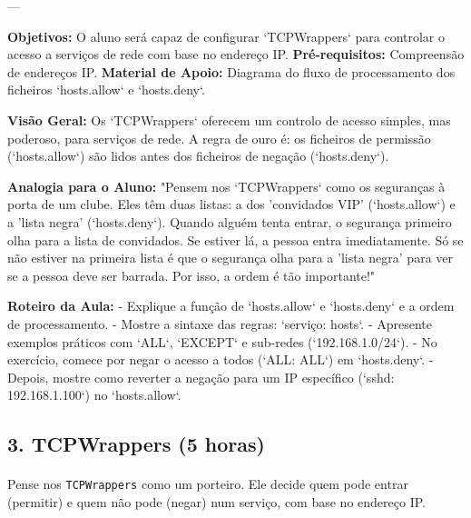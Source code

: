 \documentclass[10pt,a4paper]{article}
\newcommand{\guia}[1]{%
	\begin{tcolorbox}[
		colback=lightgray,
		colframe=darkblue,
		boxrule=1pt,
		arc=4mm,
		title=\textbf{Guia do Formador},
		fonttitle=\bfseries,
		coltitle=darkblue,
		boxsep=5pt,
		left=5mm, right=5mm, top=3mm, bottom=3mm
		]
		#1
	\end{tcolorbox}
}
\begin{document}
	---
	
	\guia{
		\textbf{Objetivos:} O aluno será capaz de configurar `TCPWrappers` para controlar o acesso a serviços de rede com base no endereço IP.
		\textbf{Pré-requisitos:} Compreensão de endereços IP.
		\textbf{Material de Apoio:} Diagrama do fluxo de processamento dos ficheiros `hosts.allow` e `hosts.deny`.
		
		\textbf{Visão Geral:} Os `TCPWrappers` oferecem um controlo de acesso simples, mas poderoso, para serviços de rede. A regra de ouro é: os ficheiros de permissão (`hosts.allow`) são lidos antes dos ficheiros de negação (`hosts.deny`).
		
		\textbf{Analogia para o Aluno:} "Pensem nos `TCPWrappers` como os seguranças à porta de um clube. Eles têm duas listas: a dos 'convidados VIP' (`hosts.allow`) e a 'lista negra' (`hosts.deny`). Quando alguém tenta entrar, o segurança primeiro olha para a lista de convidados. Se estiver lá, a pessoa entra imediatamente. Só se não estiver na primeira lista é que o segurança olha para a 'lista negra' para ver se a pessoa deve ser barrada. Por isso, a ordem é tão importante!"
		
		\textbf{Roteiro da Aula:}
		- Explique a função de `hosts.allow` e `hosts.deny` e a ordem de processamento.
		- Mostre a sintaxe das regras: `serviço: hosts`.
		- Apresente exemplos práticos com `ALL`, `EXCEPT` e sub-redes (`192.168.1.0/24`).
		- No exercício, comece por negar o acesso a todos (`ALL: ALL`) em `hosts.deny`.
		- Depois, mostre como reverter a negação para um IP específico (`sshd: 192.168.1.100`) no `hosts.allow`.
	}
	\subsection*{3. TCPWrappers (5 horas)}
	\vspace{-1em}
	\paragraph{}
	Pense nos \texttt{TCPWrappers} como um porteiro. Ele decide quem pode entrar (permitir) e quem não pode (negar) num serviço, com base no endereço IP.
	
\end{document}
